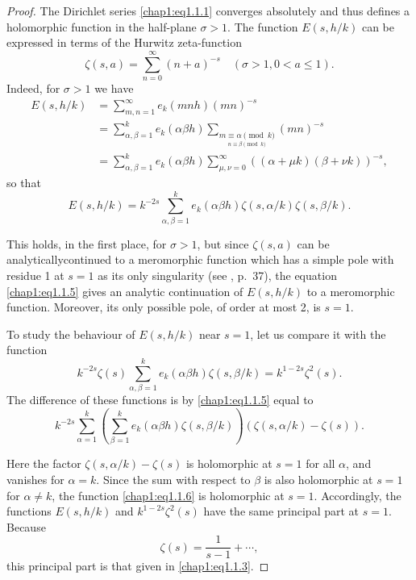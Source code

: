 \begin{proof}
The Dirichlet series \eqref{chap1:eq1.1.1} converges absolutely and
thus defines a holomorphic function in the half-plane $\sigma >1$. The
function $E(s,h/k)$ can be expressed in terms of the Hurwitz
zeta-function 
$$
\zeta(s,a) = \sum\limits_{n=0}^\infty (n+a)^{-s} \quad (\sigma >1,0<
a\leq 1).
$$
Indeed, for $\sigma > 1$ we have
\begin{align*}
E(s,h/k) &= \sum\limits_{m,n=1}^\infty e_k(mnh)(mn)^{-s}\\
&= \sum\limits_{\alpha,\beta =1}^k e_k(\alpha\beta h)
\underset{\underset{n\equiv\beta \pmod{k}}{m\equiv\alpha
    \pmod{k}}}{\sum} (mn)^{-s}\\ 
&= \sum\limits_{\alpha,\beta =1}^k e_k(\alpha\beta h)
\sum\limits_{\mu,\nu =0}^\infty ((\alpha +\mu k)(\beta +\nu k))^{-s},
\end{align*}
so that
\begin{equation}\label{chap1:eq1.1.5}
E(s,h/k)= k^{-2s}\sum\limits_{\alpha,\beta =1}^k e_k(\alpha\beta
h)\zeta(s,\alpha/k)\zeta(s,\beta/k).
\end{equation}

This holds, in the first place, for $\sigma >1$, but since
$\zeta(s,a)$ can be analytically\pageoriginale continued to a
meromorphic function which has a simple pole with residue 1 at $s=1$
as its only singularity (see \cite{key27}, p.~37), the equation
\eqref{chap1:eq1.1.5} gives an analytic continuation of $E(s,h/k)$ to
a meromorphic function. Moreover, its only possible pole, of order at
most 2, is $s=1$.

To study the behaviour of $E(s,h/k)$ near $s=1$, let us compare it
with the function
$$
k^{-2s}\zeta(s)\sum\limits_{\alpha,\beta =1}^k e_k(\alpha\beta
h)\zeta(s,\beta/k)=k^{1-2s} \zeta^2(s).
$$
The difference of these functions is by \eqref{chap1:eq1.1.5} equal to 
\begin{equation}\label{chap1:eq1.1.6}
k^{-2s}\sum\limits_{\alpha =1}^k\left(\sum\limits_{\beta =1}^k
e_k(\alpha\beta h)\zeta(s,\beta/k)\right)(\zeta(s,\alpha/k)-\zeta(s)).
\end{equation}

Here the factor $\zeta(s,\alpha/k)-\zeta(s)$ is holomorphic at $s=1$
for all $\alpha$, and vanishes for $\alpha =k$. Since the sum with
respect to $\beta$ is also holomorphic at $s=1$ for $\alpha\neq k$,
the function \eqref{chap1:eq1.1.6} is holomorphic at
$s=1$. Accordingly, the functions $E(s,h/k)$ and $k^{1-2s}\zeta^2(s)$
have the same principal part at $s=1$. Because 
$$
\zeta(s)=\frac{1}{s-1}+\cdots,
$$
this principal part is that given in \eqref{chap1:eq1.1.3}.


\end{proof}
